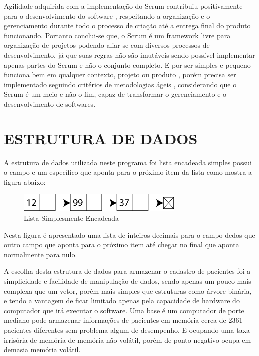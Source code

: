 \documentclass[
	12pt,				%
	oneside,			%
	a4paper,			%
  section=TITLE,
	brazil,				%
	]{abntex2}
\begin{document}
Agilidade adquirida com a implementação do Scrum contribuiu positivamente
para o desenvolvimento do software , respeitando a organização e o gerenciamento durante todo
o processo de criação até a entrega final do produto funcionando. Portanto conclui-se que, o
Scrum é um framework livre para organização de projetos podendo aliar-se com diversos
processos de desenvolvimento, já que suas regras não são imutáveis sendo possível
implementar apenas partes do Scrum e não o conjunto completo. E por ser simples e pequeno
funciona bem em qualquer contexto, projeto ou produto , porém precisa ser implementado
seguindo critérios de metodologias ágeis , considerando que o Scrum é um meio e não o fim,
capaz de transformar o gerenciamento e o desenvolvimento de softwares.

\section{ESTRUTURA DE DADOS}

A estrutura de dados utilizada neste programa foi lista encadeada simples
possui o campo e um específico que aponta para o próximo item da lista como
mostra a figura abaixo:

\begin{figure}[htb]
\caption{\label{fig_singly_linked_list}Lista Simplesmente Encadeada}
\begin{center}
\includegraphics[scale=1.70]{img/singly_linked_list.png}
\end{center}
\end{figure}

Nesta figura é apresentado uma lista de inteiros decimais para o campo dedos
que outro campo que aponta para o próximo item até chegar no final que aponta
normalmente para nulo.

A escolha desta estrutura de dados para armazenar o cadastro de pacientes foi a
simplicidade e facilidade de manipulação de dados, sendo apenas um pouco mais
complexa que um vetor, porém mais simples que estruturas como árvore binária, e
tendo a vantagem de ficar limitado apenas pela capacidade de hardware do
computador que irá executar o software. Uma base é um computador de porte
mediano pode armazenar informações de pacientes em memória cerca de 2361
pacientes diferentes sem problema algum de desempenho. E ocupando uma taxa
irrisória de memória de memória não volátil, porém de ponto negativo ocupa em
demasia memória volátil.
\end{document}

